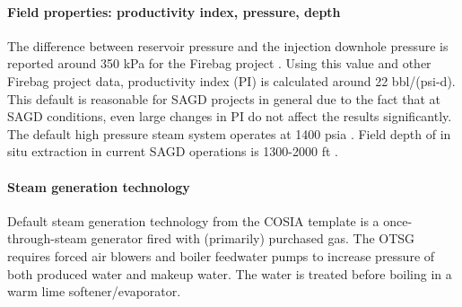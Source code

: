 \documentclass[11pt]{report}
\begin{document}
\paragraph{Field properties: productivity index, pressure, depth}
The difference between reservoir pressure and the injection downhole pressure is reported around 350 kPa for the Firebag project \cite{AERvarISPP}. Using this value and other Firebag project data, productivity index (PI) is calculated around 22 bbl/(psi-d). This default is reasonable for SAGD projects in general due to the fact that at SAGD conditions, even large changes in PI do not affect the results significantly.   The default high pressure steam system operates at 1400 psia \cite{COSIA2014}.  Field depth of in situ extraction in current SAGD operations is 1300-2000 ft \cite{COSIA2014}.

\paragraph{Steam generation technology}
Default steam generation technology from the COSIA template is a once-through-steam generator fired with (primarily) purchased gas.  The OTSG requires forced air blowers and boiler feedwater pumps to increase pressure of both produced water and makeup water. The water is treated before boiling in a warm lime softener/evaporator.

\end{document}
